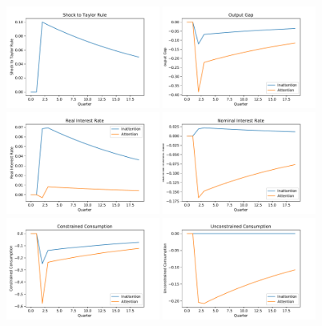 \documentclass[AER]{AEA}
\begin{document}
\begin{figure}
	\includegraphics[width=0.45\textwidth]{../Figures/shock.pdf}
	\includegraphics[width=0.45\textwidth]{../Figures/output_gap.pdf}
	\includegraphics[width=0.45\textwidth]{../Figures/real_rate.pdf}
	\includegraphics[width=0.45\textwidth]{../Figures/nominal_rate.pdf}
	\includegraphics[width=0.45\textwidth]{../Figures/constrained.pdf}
	\includegraphics[width=0.45\textwidth]{../Figures/unconstrained.pdf}

\end{figure}
\end{document}
